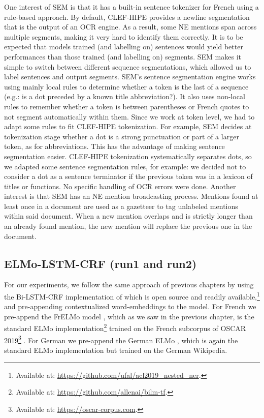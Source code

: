 One interest of SEM is that it has a built-in sentence tokenizer for French using a rule-based approach. By default, CLEF-HIPE provides a newline segmentation that is the output of an OCR engine. As a result, some NE mentions span across multiple segments, making it very hard to identify them correctly. It is to be expected that models trained (and labelling on) sentences would yield better performances than those trained (and labelling on) segments. SEM makes it simple to switch between different sequence segmentations, which allowed us to label sentences and output segments. SEM's sentence segmentation engine works using mainly local rules to determine whether a token is the last of a sequence (e.g.: is a dot preceded by a known title abbreviation?). It also uses non-local rules to remember whether a token is between parentheses or French quotes to not segment automatically within them. Since we work at token level, we had to adapt some rules to fit CLEF-HIPE tokenization. For example, SEM decides at tokenization stage whether a dot is a strong punctuation or part of a larger token, as for abbreviations. This has the advantage of making sentence segmentation easier. CLEF-HIPE tokenization systematically separates dots, so we adapted some sentence segmentation rules, for example: we decided not to consider a dot as a sentence terminator if the previous token was in a lexicon of titles or functions. No specific handling of OCR errors were done. Another interest is that SEM has an NE mention broadcasting process. Mentions found at least once in a document are used as a gazetteer to tag unlabeled mentions within said document. When a new mention overlaps and is strictly longer than an already found mention, the new mention will replace the previous one in the document.

\subsection{ELMo-LSTM-CRF (run1 and run2)}
For our experiments, we follow the same approach of previous chapters by using the Bi-LSTM-CRF implementation of \citet{strakova-etal-2019-neural} which is open source and readily available,\footnote{Available at: \url{https://github.com/ufal/acl2019_nested_ner}.} and pre-appending contextualized word-embeddings to the model. For French we pre-append the FrELMo model \citet{ortiz-suarez-etal-2020-establishing}, which as we saw in the previous chapter, is the standard ELMo \citep{peters-etal-2018-deep} implementation\footnote{Available at: \url{https://github.com/allenai/bilm-tf}.} trained on the French subcorpus of OSCAR 2019\footnote{Available at: \url{https://oscar-corpus.com}.} \citep{ortiz-suarez-etal-2019-asynchronous,ortiz-suarez-etal-2020-monolingual}. For German we pre-append the German ELMo \citep{may-2019-german}, which is again the standard ELMo implementation but trained on the German Wikipedia.

